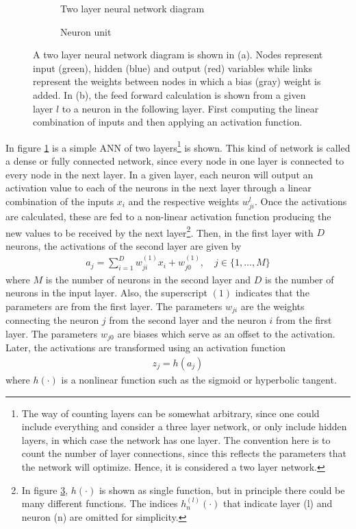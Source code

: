 \begin{figure}
  \begin{subfigure}[b]{0.4\textwidth}
    
    \caption{Two layer neural network diagram}
    \label{fig:ann}
  \end{subfigure}
\hfill
  \begin{subfigure}[b]{0.4\textwidth}
    
    \caption{Neuron unit}
    \label{fig:feed_forward}
  \end{subfigure}
  \caption[Illustration of a two layer fully connected neural network (a) and a neuron unit (b)]{A two layer neural network diagram is shown in (a). Nodes represent input (green), hidden (blue) and output (red) variables while links represent the weights between nodes in which a bias (gray) weight is added. In (b), the feed forward calculation is shown from a given layer $l$ to a neuron in the following layer. First computing the linear combination of inputs and then applying an activation function. }
\end{figure}

In figure \ref{fig:ann} is a simple ANN of two layers\footnote{The way of counting layers can be somewhat arbitrary, since one could include everything and consider a three layer network, or only include hidden layers, in which case the network has one layer. The convention here is to count the number of layer connections, since this reflects the parameters that the network will optimize. Hence, it is considered a two layer network.} is shown. This kind of network is called a dense or fully connected network, since every node in one layer is connected to every node in the next layer. In a given layer, each neuron will output an activation value to each of the neurons in the next layer through a linear combination of the inputs $x_i$ and the respective weights $w^l_{ji}$. Once the activations are calculated, these are fed to a non-linear activation function producing the new values to be received by the next layer\footnote{In figure \ref{fig:feed_forward}, $h(\cdot)$ is shown as single function, but in principle there could be many different functions. The indices $h^{(l)}_n(\cdot)$ that indicate layer (l) and neuron (n) are omitted for simplicity.}. Then, in the first layer with $D$ neurons, the activations of the second layer are given by
\begin{align*}
    a_j = \sum^D_{i=1}w^{(1)}_{ji}x_i+w^{(1)}_{j0}, \quad j \in \{1,\ldots, M\}
\end{align*}
where $M$ is the number of neurons in the second layer and $D$ is the number of neurons in the input layer. Also, the superscript $(1)$ indicates that the parameters are from the first layer. The parameters $w_{ji}$ are the weights connecting the neuron $j$ from the second layer and the neuron $i$ from the first layer. The parameters $w_{j0}$ are biases which serve as an offset to the activation. Later, the activations are transformed using an activation function
\begin{align*}
    z_j = h(a_j)
\end{align*}
where $h(\cdot)$ is a nonlinear function such as the sigmoid or hyperbolic tangent.

